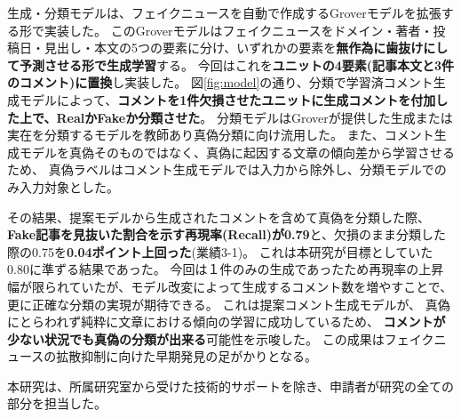 {	生成・分類モデルは、フェイクニュースを自動で作成するGroverモデル\cite{NIPS2019_9106}を拡張する形で実装した。
	このGroverモデルはフェイクニュースをドメイン・著者・投稿日・見出し・本文の5つの要素に分け、いずれかの要素を\textbf{無作為に歯抜けにして予測させる形で生成学習}する。
	今回はこれを\textbf{ユニットの4要素(記事本文と3件のコメント)に置換}し実装した。
	図\ref{fig:model}の通り、分類で学習済コメント生成モデルによって、\textbf{コメントを1件欠損させたユニットに生成コメントを付加した上で、RealかFakeか分類させた}。
	分類モデルはGroverが提供した生成または実在を分類するモデルを教師あり真偽分類に向け流用した。
	また、コメント生成モデルを真偽そのものではなく、真偽に起因する文章の傾向差から学習させるため、
	真偽ラベルはコメント生成モデルでは入力から除外し、分類モデルでのみ入力対象とした。

	その結果、提案モデルから生成されたコメントを含めて真偽を分類した際、\textbf{Fake記事を見抜いた割合を示す再現率(Recall)が0.79}と、欠損のまま分類した際の0.75を\textbf{0.04ポイント上回った}(業績3-1)。
	これは本研究が目標としていた0.80に準ずる結果であった。
	今回は１件のみの⽣成であったため再現率の上昇幅が限られていたが、モデル改変によって⽣成するコメント数を増やすことで、
	更に正確な分類の実現が期待できる。
	これは提案コメント生成モデルが、
	真偽にとらわれず純粋に文章における傾向の学習に成功しているため、
	\textbf{コメントが少ない状況でも真偽の分類が出来る}可能性を示唆した。
	この成果はフェイクニュースの拡散抑制に向けた早期発⾒の足がかりとなる。

	本研究は、所属研究室から受けた技術的サポートを除き、申請者が研究の全ての部分を担当した。

}
